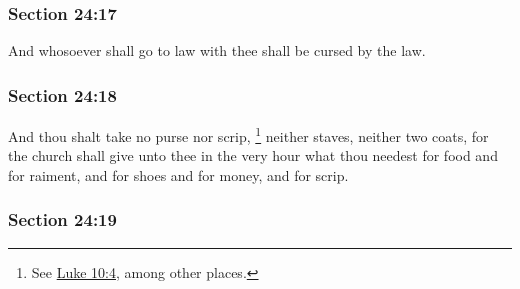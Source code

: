 
	\subsubsection{Section 24:17} %
		\label{DC24-17}

		And whosoever shall go to law with thee shall be cursed by the law.


	\subsubsection{Section 24:18} %
		\label{DC24-18}

		And thou shalt take no purse nor scrip,%
			\footnote{%
				See \hyperref[LUKE-10-4]{Luke 10:4}, among other places.
				}
		neither staves, neither two coats, for the church shall give unto thee in the very hour what thou needest for food and for raiment, and for shoes and for money, and for scrip.


	\subsubsection{Section 24:19} %
		\label{DC24-19}

